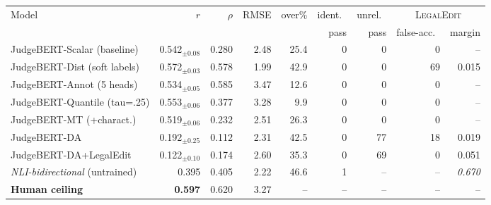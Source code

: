 \setlength{\tabcolsep}{4.5pt}
\begin{tabular}{lrrrrrrrr}
\toprule
Model & $r$ & $\rho$ & RMSE & over\% & ident.\ & unrel.\ & \multicolumn{2}{c}{\textsc{LegalEdit}} \\
\cmidrule(lr){8-9}
 &  &  &  &  & pass & pass & false-acc.\ & margin \\
\midrule
JudgeBERT-Scalar (baseline) & 0.542$_{\pm0.08}$ & 0.280 & 2.48 & 25.4 & 0 & 0 & 0 & -- \\
JudgeBERT-Dist (soft labels) & 0.572$_{\pm0.03}$ & 0.578 & 1.99 & 42.9 & 0 & 0 & 69 & 0.015 \\
JudgeBERT-Annot (5 heads) & 0.534$_{\pm0.05}$ & 0.585 & 3.47 & 12.6 & 0 & 0 & 0 & -- \\
JudgeBERT-Quantile (tau=.25) & 0.553$_{\pm0.06}$ & 0.377 & 3.28 & 9.9 & 0 & 0 & 0 & -- \\
JudgeBERT-MT (+charact.) & 0.519$_{\pm0.06}$ & 0.232 & 2.51 & 26.3 & 0 & 0 & 0 & -- \\
\midrule
JudgeBERT-DA & 0.192$_{\pm0.25}$ & 0.112 & 2.31 & 42.5 & 0 & 77 & 18 & 0.019 \\
JudgeBERT-DA+LegalEdit & 0.122$_{\pm0.10}$ & 0.174 & 2.60 & 35.3 & 0 & 69 & 0 & 0.051 \\
\midrule
\emph{NLI-bidirectional} (untrained) & 0.395 & 0.405 & 2.22 & 46.6 & 1 & -- & -- & \emph{0.670} \\
\textbf{Human ceiling} & \textbf{0.597} & 0.620 & 3.27 & -- & -- & -- & -- & -- \\
\bottomrule
\end{tabular}